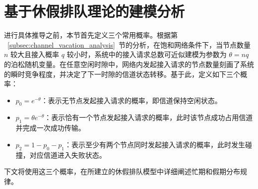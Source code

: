 \section{基于休假排队理论的建模分析}
进行具体推导之前，本节首先定义三个常用概率。根据第 ~\ref{subsec:channel_vacation_analysis}~节的分析，在饱和网络条件下，当节点数量 $n$ 较大且接入概率 $q$ 较小时，系统中的接入请求总数可近似建模为参数为 $\theta = nq$ 的泊松随机变量。在任意空闲时隙中，网络内发起接入请求的节点数量刻画了系统的瞬时竞争程度，并决定了下一时隙的信道状态转移。基于此，定义如下三个概率：
\begin{itemize}
	\item $p_0 = e^{-\theta}$：表示无节点发起接入请求的概率，即信道保持空闲状态。
	\item $p_1 = \theta e^{-\theta}$：表示恰有一个节点发起接入请求的概率，此时该节点成功占用信道并完成一次成功传输。
	\item $p_2 = 1 - p_0 - p_1$：表示至少有两个节点同时发起接入请求的概率，此时发生碰撞，对应信道进入失败状态。
\end{itemize}
下文将使用这三个概率，在所建立的休假排队模型中详细阐述忙期和假期分布规律。

